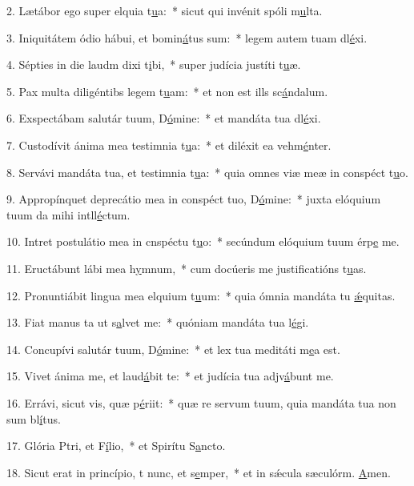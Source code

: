 2. Lætábor ego super elquia t\uline{u}a:~* sicut qui invénit spóli m\uline{u}lta.\par 
3. Iniquitátem ódio hábui, et bomin\uline{á}tus sum:~* legem autem tuam dl\uline{é}xi.\par 
4. Sépties in die laudm dixi t\uline{i}bi,~* super judícia justíti t\uline{u}æ.\par 
5. Pax multa diligéntibs legem t\uline{u}am:~* et non est ills sc\uline{á}ndalum.\par 
6. Exspectábam salutár tuum, D\uline{ó}mine:~* et mandáta tua dl\uline{é}xi.\par 
7. Custodívit ánima mea testimnia t\uline{u}a:~* et diléxit ea vehm\uline{é}nter.\par 
8. Servávi mandáta tua, et testimnia t\uline{u}a:~* quia omnes viæ meæ in conspéct t\uline{u}o.\par 
9. Appropínquet deprecátio mea in conspéct tuo, D\uline{ó}mine:~* juxta elóquium tuum da mihi intll\uline{é}ctum.\par 
10. Intret postulátio mea in cnspéctu t\uline{u}o:~* secúndum elóquium tuum érp\uline{e} me.\par 
11. Eructábunt lábi mea h\uline{y}mnum,~* cum docúeris me justificatións t\uline{u}as.\par 
12. Pronuntiábit lingua mea elquium t\uline{u}um:~* quia ómnia mandáta tu \uline{ǽ}quitas.\par 
13. Fiat manus ta ut s\uline{a}lvet me:~* quóniam mandáta tua l\uline{é}gi.\par 
14. Concupívi salutár tuum, D\uline{ó}mine:~* et lex tua meditáti m\uline{e}a est.\par 
15. Vivet ánima me, et laud\uline{á}bit te:~* et judícia tua adjv\uline{á}bunt me.\par 
16. Errávi, sicut vis, quæ p\uline{é}riit:~* quæ re servum tuum, quia mandáta tua non sum bl\uline{í}tus.\par 
17. Glória Ptri, et F\uline{í}lio,~* et Spirítu S\uline{a}ncto.\par 
18. Sicut erat in princípio, t nunc, et s\uline{e}mper,~* et in sǽcula sæculórm. \uline{A}men.\par 
